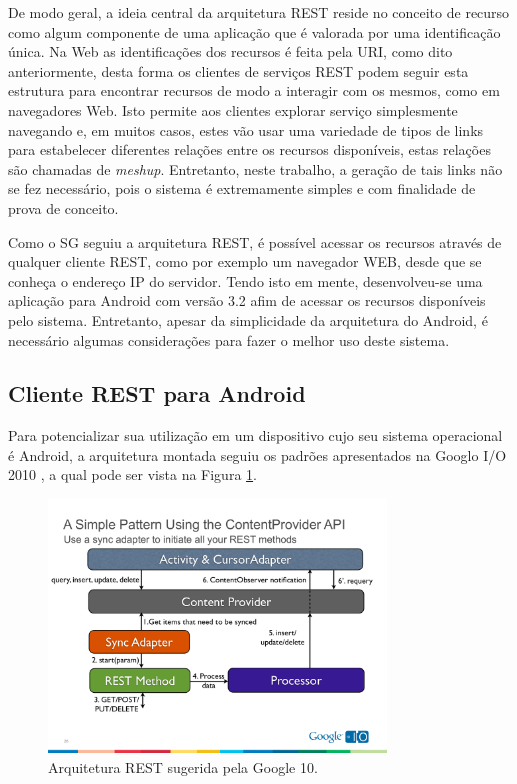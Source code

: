 \documentclass[12pt,a4paper,oneside]{report}
\begin{document}
De modo geral, a ideia central da arquitetura REST reside no conceito de recurso como algum componente de uma aplicação que é valorada por uma identificação única. Na Web as identificações dos recursos é feita pela URI, como dito anteriormente, desta forma os clientes de serviços REST podem seguir esta estrutura para encontrar recursos de modo a interagir com os mesmos, como em navegadores Web. Isto permite aos clientes explorar serviço simplesmente navegando e, em muitos casos, estes vão usar uma variedade de tipos de links para estabelecer diferentes relações entre os recursos disponíveis, estas relações são chamadas de \emph{meshup}. Entretanto, neste trabalho, a geração de tais links não se fez necessário, pois o sistema é extremamente simples e com finalidade de prova de conceito.

Como o SG seguiu a arquitetura REST, é possível acessar os recursos através de qualquer cliente REST, como por exemplo um navegador WEB, desde que se conheça o endereço IP do servidor. Tendo isto em mente, desenvolveu-se uma aplicação para Android com versão 3.2 afim de acessar os recursos disponíveis pelo sistema. Entretanto, apesar da simplicidade da arquitetura do Android, é necessário algumas considerações para fazer o melhor uso deste sistema.

\subsection{Cliente REST para Android}

Para potencializar sua utilização em um dispositivo cujo seu sistema operacional é Android, a arquitetura montada seguiu os padrões apresentados na Googlo I/O 2010 \cite{restclient}, a qual pode ser vista na Figura \ref{fig:rest_android}.

\begin{figure}[h!]
   \centering
    \includegraphics[width=0.8\textwidth]{figuras/rest_android}
    \caption{Arquitetura REST sugerida pela Google 10.}
    \label{fig:rest_android}
\end{figure}
\end{document}
